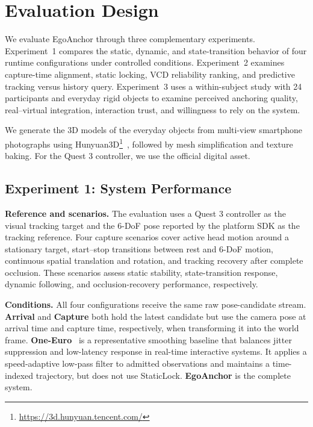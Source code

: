 \documentclass[review]{vgtc}
\begin{document}
\section{Evaluation Design}\label{sec:evaluation}

We evaluate EgoAnchor through three complementary experiments. Experiment~1 compares the static, dynamic, and state-transition behavior of four runtime configurations under controlled conditions. Experiment~2 examines capture-time alignment, static locking, VCD reliability ranking, and predictive tracking versus history query. Experiment~3 uses a within-subject study with 24 participants and everyday rigid objects to examine perceived anchoring quality, real--virtual integration, interaction trust, and willingness to rely on the system.

We generate the 3D models of the everyday objects from multi-view smartphone photographs using Hunyuan3D\footnote{\url{https://3d.hunyuan.tencent.com/}}~\cite{hunyuan3d22025tencent}, followed by mesh simplification and texture baking. For the Quest 3 controller, we use the official digital asset.

\subsection{Experiment 1: System Performance}\label{sec:exp1-design}

\textbf{Reference and scenarios.}
The evaluation uses a Quest 3 controller as the visual tracking target and the 6-DoF pose reported by the platform SDK as the tracking reference. Four capture scenarios cover active head motion around a stationary target, start--stop transitions between rest and 6-DoF motion, continuous spatial translation and rotation, and tracking recovery after complete occlusion. These scenarios assess static stability, state-transition response, dynamic following, and occlusion-recovery performance, respectively.

\textbf{Conditions.}
All four configurations receive the same raw pose-candidate stream. \textbf{Arrival} and \textbf{Capture} both hold the latest candidate but use the camera pose at arrival time and capture time, respectively, when transforming it into the world frame. \textbf{One-Euro}~\cite{casiez2012oneeuro} is a representative smoothing baseline that balances jitter suppression and low-latency response in real-time interactive systems. It applies a speed-adaptive low-pass filter to admitted observations and maintains a time-indexed trajectory, but does not use StaticLock. \textbf{EgoAnchor} is the complete system.
\end{document}
